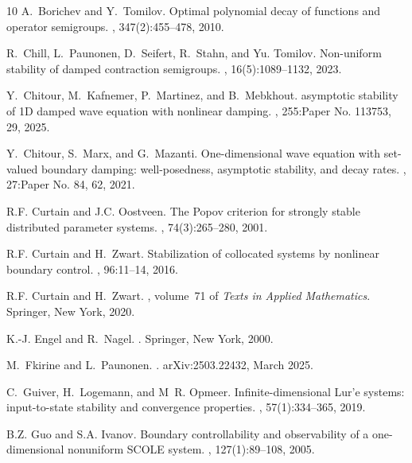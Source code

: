 \documentclass[11pt, a4paper]{amsart}
\theoremstyle{definition}
\numberwithin{equation}{section}
\begin{document}
\begin{thebibliography}{10}
A.~Borichev and Y.~Tomilov.
\newblock Optimal polynomial decay of functions and operator semigroups.
, 347(2):455--478, 2010.

R.~{Chill}, L.~{Paunonen}, D.~{Seifert}, R.~{Stahn}, and Yu. {Tomilov}.
\newblock Non-uniform stability of damped contraction semigroups.
, 16(5):1089--1132, 2023.

Y.~Chitour, M.~Kafnemer, P.~Martinez, and B.~Mebkhout.
 asymptotic stability of 1{D} damped wave equation with
  nonlinear damping.
, 255:Paper No. 113753, 29, 2025.

Y.~Chitour, S.~Marx, and G.~Mazanti.
\newblock One-dimensional wave equation with set-valued boundary damping:
  well-posedness, asymptotic stability, and decay rates.
, 27:Paper No. 84, 62, 2021.

R.F. Curtain and J.C. Oostveen.
\newblock The {P}opov criterion for strongly stable distributed parameter
  systems.
, 74(3):265--280, 2001.

R.F. Curtain and H.~Zwart.
\newblock Stabilization of collocated systems by nonlinear boundary control.
, 96:11--14, 2016.

R.F. Curtain and H.~Zwart.
, volume~71
  of {\em Texts in Applied Mathematics}.
\newblock Springer, New York, 2020.

K.-J. Engel and R.~Nagel.
.
\newblock Springer, New York, 2000.

M.~{Fkirine} and L.~{Paunonen}.
.
\newblock arXiv:2503.22432, March 2025.

C.~Guiver, H.~Logemann, and M~R. Opmeer.
\newblock Infinite-dimensional {L}ur'e systems: input-to-state stability and
  convergence properties.
, 57(1):334--365, 2019.

B.Z. Guo and S.A. Ivanov.
\newblock Boundary controllability and observability of a one-dimensional
  nonuniform {SCOLE} system.
, 127(1):89--108, 2005.


\end{thebibliography}
\end{document}
